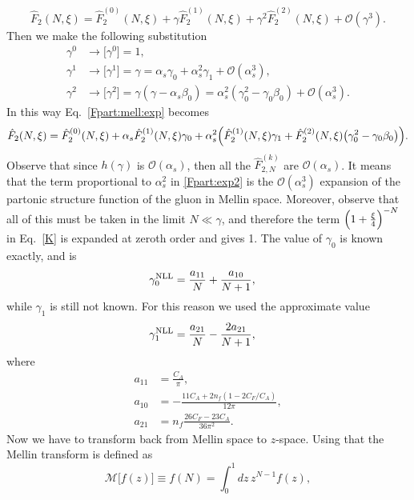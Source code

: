 \documentclass[a4paper]{article}
\newcommand{\ord}[1]{\mathcal{O} (\alpha_s^{#1})}
\begin{document}
\begin{equation}\label{Fpart:mell:exp}
	\hat{F}_{2}(N, \xi)= \hat{F}_{2}^{(0)}(N, \xi)+\gamma \hat{F}_{2}^{(1)}(N, \xi)+ \gamma^2 \hat{F}_{2}^{(2)}(N, \xi)+\mathcal{O}(\gamma^3).
\end{equation}
Then we make the following substitution
\begin{align}
	\gamma^0 & \rightarrow \bigl[\gamma^0\bigr] =1 ,\\
	\gamma^1 & \rightarrow \bigl[\gamma^1\bigr] =\gamma=\alpha_s \gamma_0 +\alpha_s^2 \gamma_1 +\mathcal{O}(\alpha_s^3) ,\\
	\gamma^2 & \rightarrow \bigl[\gamma^2\bigr]=\gamma(\gamma-\alpha_s\beta_0) =\alpha_s^2(\gamma^2_0- \gamma_0\beta_0) +\mathcal{O}(\alpha_s^3) .
\end{align}
In this way Eq.~\eqref{Fpart:mell:exp} becomes
\begin{equation}\label{Fpart:exp2}
	\hat{F}_{2}(N, \xi)=\hat{F}_{2}^{(0)}(N, \xi)+\alpha_s \hat{F}_{2}^{(1)}(N, \xi) \gamma_0+ \alpha_s^2\Bigl(\hat{F}_{2}^{(1)}(N, \xi) \gamma_1 + \hat{F}_{2}^{(2)}(N, \xi)\bigl(\gamma_0^2-\gamma_0\beta_0\bigr)\Bigr).
\end{equation}
Observe that since $h(\gamma)$ is $\ord{}$, then all the $\hat{F}_{2,N}^{(k)}$ are $\ord{}$. It means that the term proportional to $\alpha_s^2$ in \eqref{Fpart:exp2} is the $\ord{3}$ expansion of the partonic structure function of the gluon in Mellin space. Moreover, observe that all of this must be taken in the limit $N \ll \gamma$, and therefore the term $\Bigl(1+\frac{\xi}{4}\Bigr)^{-N}$ in Eq.~\eqref{K} is expanded at zeroth order and gives 1.
The value of $\gamma_0$ is known exactly, and is
\begin{align}
	\gamma^{\rm NLL}_0&=\frac{a_{11}}{N}+\frac{a_{10}}{N+1},
\end{align}
while $\gamma_1$ is still not known. For this reason we used the approximate value
\begin{align}
	\gamma^{\rm NLL}_1&=\frac{a_{21}}{N}-\frac{2a_{21}}{N+1},
\end{align}
where
\begin{align}
	a_{11}&=\frac{C_A}{\pi}, \\
	a_{10}&=-\frac{11C_A + 2n_f(1-2C_F/C_A)}{12\pi}, \\
	a_{21}&=n_f\frac{26C_F - 23C_A}{36 \pi^2}.
\end{align}
Now we have to transform back from Mellin space to $z$-space. Using that the Mellin transform is defined as
\begin{equation}
	\mathcal{M}\bigl[f(z)\bigr]\equiv f(N)=\int_0^1dz\,z^{N-1}f(z),
\end{equation}
\end{document}
